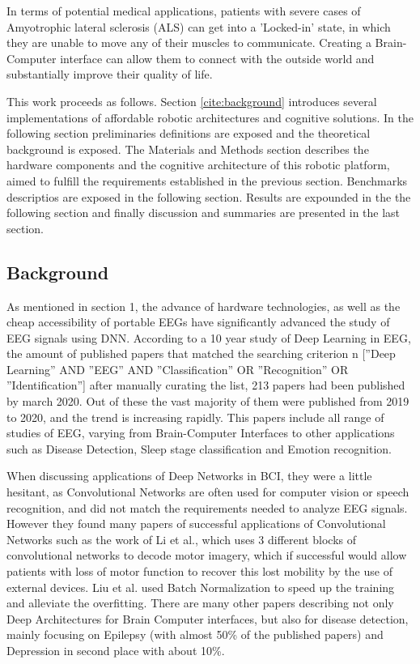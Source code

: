\documentclass[conference]{IEEEtran}
\begin{document}
In terms of potential medical applications, patients with severe cases of Amyotrophic lateral sclerosis (ALS) can get into a 'Locked-in' state, in which they are unable to move any of their muscles to communicate. Creating a Brain-Computer interface can allow them to connect with the outside world  and substantially improve their quality of life\cite{GUY20185}.


This work proceeds as follows.  Section \ref{cite:background} introduces several implementations of affordable robotic architectures and cognitive solutions.  In the following section preliminaries definitions are exposed and the theoretical background is exposed.  The Materials and Methods section describes the hardware components and the cognitive architecture of this robotic platform, aimed to fulfill the requirements established in the previous section.  Benchmarks descriptios are exposed in the following section.  Results are expounded in the the following section and finally discussion and summaries are presented in the last section.

\subsection{Background}
\label{background}


As mentioned in section 1, the advance of hardware technologies, as well as the cheap accessibility of portable EEGs have significantly advanced the study of EEG signals using DNN. According to a 10 year study of Deep Learning in EEG\cite{dnn10years}, the amount of published papers that matched the searching criterion n [”Deep Learning” AND ”EEG” AND ”Classification” OR ”Recognition” OR ”Identification”] after manually curating the list, 213 papers had been published by march 2020. Out of these the vast majority of them were published from 2019 to 2020, and the trend is increasing rapidly. This papers include all range of studies of EEG, varying from Brain-Computer Interfaces to other applications such as Disease Detection, Sleep stage classification and Emotion recognition. 

When discussing applications of Deep Networks in BCI, they were a little hesitant, as Convolutional Networks are often used for computer vision or speech recognition, and did not match the requirements needed to analyze EEG signals. However they found many papers of successful applications of Convolutional Networks such as the work of Li et al.\cite{LI8709723}, which uses 3 different blocks of convolutional networks to decode motor imagery, which if successful would allow patients with loss of motor function to recover this lost mobility by the use of external devices. Liu et al. \cite{LIU2018288} used Batch Normalization to speed up the training and alleviate the overfitting. There are many other papers describing not only Deep Architectures for Brain Computer interfaces, but also for disease detection, mainly focusing on Epilepsy (with almost  50\% of the published papers) and Depression in second place with about 10\%.
\end{document}
